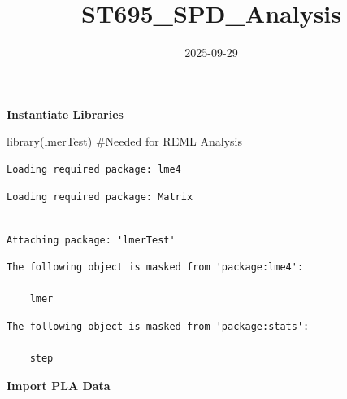 \documentclass[
  letterpaper,
  DIV=11,
  numbers=noendperiod]{scrartcl}
\title{ST695\_SPD\_Analysis}
\author{}
\date{2025-09-29}
\newenvironment{Shaded}{\begin{snugshade}}{\end{snugshade}}
\newcommand{\CommentTok}[1]{\textcolor[rgb]{0.37,0.37,0.37}{#1}}
\newcommand{\DecValTok}[1]{\textcolor[rgb]{0.68,0.00,0.00}{#1}}
\newcommand{\FunctionTok}[1]{\textcolor[rgb]{0.28,0.35,0.67}{#1}}
\newcommand{\NormalTok}[1]{\textcolor[rgb]{0.00,0.23,0.31}{#1}}
\newcommand{\OtherTok}[1]{\textcolor[rgb]{0.00,0.23,0.31}{#1}}
\newcommand{\SpecialCharTok}[1]{\textcolor[rgb]{0.37,0.37,0.37}{#1}}
\newcommand{\StringTok}[1]{\textcolor[rgb]{0.13,0.47,0.30}{#1}}
\begin{document}
\maketitle


\textbf{Instantiate Libraries}

\begin{Shaded}
\begin{Highlighting}[]
\FunctionTok{library}\NormalTok{(lmerTest) }\CommentTok{\#Needed for REML Analysis}
\end{Highlighting}
\end{Shaded}

\begin{verbatim}
Loading required package: lme4
\end{verbatim}

\begin{verbatim}
Loading required package: Matrix
\end{verbatim}

\begin{verbatim}

Attaching package: 'lmerTest'
\end{verbatim}

\begin{verbatim}
The following object is masked from 'package:lme4':

    lmer
\end{verbatim}

\begin{verbatim}
The following object is masked from 'package:stats':

    step
\end{verbatim}

\textbf{Import PLA Data}

\begin{Shaded}
\end{Shaded}
\end{document}
